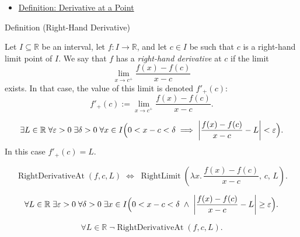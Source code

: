 \begin{dependencies}
\begin{itemize}
  \item \hyperref[def:derivative-at-a-point]{Definition: Derivative at a Point}
\end{itemize}
\end{dependencies}


\begin{definitionbox}{Definition (Right-Hand Derivative)}
\begin{definition}
\label{def:right-hand-derivative}
Let $I \subseteq \mathbb{R}$ be an interval, let $f : I \to \mathbb{R}$, and let $c \in I$ be such that $c$ is a right-hand limit point of $I$. We say that $f$ has a \emph{right-hand derivative} at $c$ if the limit
\[
\lim_{x \to c^+} \frac{f(x) - f(c)}{x - c}
\]
exists. In that case, the value of this limit is denoted $f'_+(c)$:
\[
f'_+(c) := \lim_{x \to c^+} \frac{f(x) - f(c)}{x - c}.
\]
\end{definition}
\end{definitionbox}

\begin{remark*}
\[
\exists L \in \mathbb{R}\;\forall \varepsilon > 0\;\exists \delta > 0\;\forall x \in I
\Bigl(0 < x - c < \delta \implies \left|\frac{f(x)-f(c)}{x-c} - L\right| < \varepsilon\Bigr).
\]
In this case $f'_+(c) = L$.
\end{remark*}

\begin{remark*}
\[
\operatorname{RightDerivativeAt}(f, c, L)
\;\Longleftrightarrow\;
\operatorname{RightLimit}\!\left(\lambda x.\,\frac{f(x)-f(c)}{x-c},\, c,\, L\right).
\]
\end{remark*}

\begin{remark*}
\[
\forall L \in \mathbb{R}\;\exists \varepsilon > 0\;\forall \delta > 0\;\exists x \in I
\Bigl(0 < x - c < \delta \;\land\; \left|\frac{f(x)-f(c)}{x-c} - L\right| \ge \varepsilon\Bigr).
\]
\end{remark*}

\begin{remark*}
\[
\forall L \in \mathbb{R}\;\lnot\operatorname{RightDerivativeAt}(f, c, L).
\]
\end{remark*}

